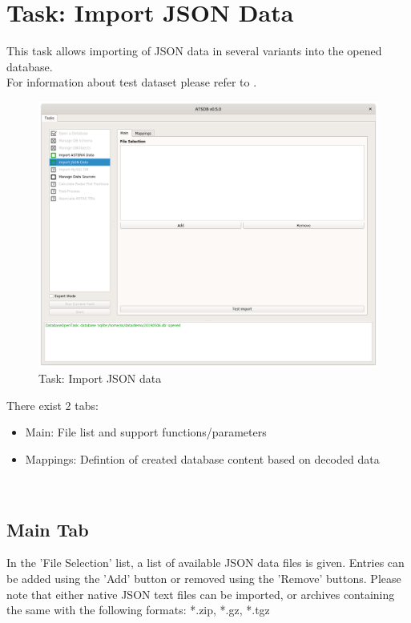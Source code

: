 \section{Task: Import JSON Data}
\label{sec:task_import_json}

This task allows importing of JSON data in several variants into the opened database. \\

For information about test dataset please refer to . \\

\begin{figure}[H]
  \hspace*{-2.5cm}
    \includegraphics[width=19cm]{../screenshots/import_json_data.png}
  \caption{Task: Import JSON data}
\end{figure}

There exist 2 tabs:

\begin{itemize}  
\item Main: File list and support functions/parameters
\item Mappings: Defintion of created database content based on decoded data
\end{itemize}
\ \\

\subsection{Main Tab}

In the 'File Selection' list, a list of available JSON data files is given. Entries can be added using the 'Add' button or removed using the 'Remove' buttons. Please note that either native JSON text files can be imported, or archives containing the same with the following formats: *.zip, *.gz, *.tgz \\


